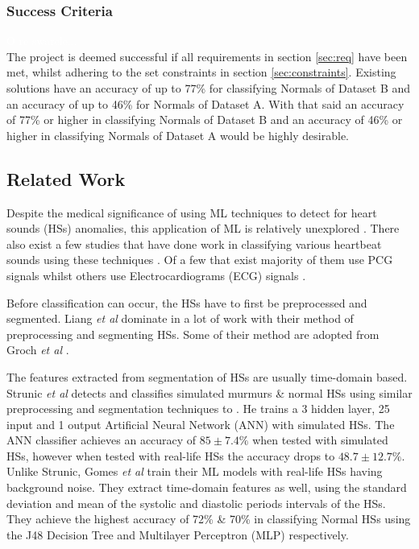 \documentclass[10pt,twocolumn]{witseiepaper}
\begin{document}
\subsubsection{Success Criteria}
\textcolor{white}{O re swarele...}\\
The project is deemed successful if all requirements in section \ref{sec:req} have been met, whilst adhering to the set constraints in section \ref{sec:constraints}. Existing solutions
have an accuracy of up to 77\% for classifying Normals of Dataset B and an accuracy of up to 46\%
for Normals of Dataset A. With that said an accuracy of 77\% or higher in classifying Normals of Dataset B and
an accuracy of 46\% or higher in classifying Normals of Dataset A would be highly desirable.

\subsection{Related Work}
\label{sec:lit}
Despite the medical significance of using ML techniques to detect for heart sounds (HSs) anomalies, this application of ML is relatively unexplored \cite{bentley}. There also exist a few studies that have done work in classifying various heartbeat sounds using these techniques \cite{26}. Of a few that exist majority of them use PCG signals \cite{53,51,36,37} whilst others use Electrocardiograms (ECG) signals \cite{4,5}. 

Before classification can occur, the HSs have to first be preprocessed and segmented. Liang \textit{et al} \cite{6} dominate in a lot of work \cite{11,19,15,50} with their method of preprocessing and segmenting HSs. Some of their method are adopted from Groch \textit{et al} \cite{2}. 

The features extracted from segmentation of HSs are usually time-domain based. Strunic \textit{et al} \cite{3} detects and classifies simulated murmurs \& normal HSs using similar preprocessing and segmentation techniques to \cite{6}. He trains a 3 hidden layer, 25 input and 1 output Artificial Neural Network (ANN) with simulated HSs. The ANN classifier achieves an accuracy of $85\pm7.4\%$ when tested with simulated HSs, however when tested with real-life HSs the accuracy drops to $48.7\pm12.7\%$. Unlike Strunic, Gomes \textit{et al} \cite{gomes2012classifying} train their ML models with real-life HSs having background noise. They extract time-domain features as well, using the standard deviation and mean of the systolic and diastolic periods intervals of the HSs. They achieve the highest accuracy of 72\% \& 70\% in classifying Normal HSs using the J48 Decision Tree and Multilayer Perceptron (MLP) respectively.
\end{document}
